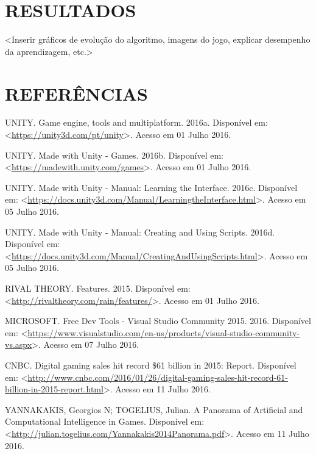 \documentclass[12pt,a4paper]{article}
\begin{document}

\FloatBarrier
\newpage %
\section{RESULTADOS}
	<Inserir gráficos de evolução do algoritmo, imagens do jogo, explicar desempenho da aprendizagem, etc.>

\FloatBarrier
\newpage %
\section*{\hfil REFERÊNCIAS}
	\singlespace
	UNITY. Game engine, tools and multiplatform. 2016a. Disponível em: \textless \url{https://unity3d.com/pt/unity}\textgreater. Acesso em 01 Julho 2016.\par
	UNITY. Made with Unity - Games. 2016b. Disponível em: \textless \url{https://madewith.unity.com/games}\textgreater. Acesso em 01 Julho 2016.\par
	UNITY. Made with Unity - Manual: Learning the Interface. 2016c. Disponível em: \textless \url{https://docs.unity3d.com/Manual/LearningtheInterface.html}\textgreater. Acesso em 05 Julho 2016.\par
	UNITY. Made with Unity - Manual: Creating and Using Scripts. 2016d. Disponível em: \textless \url{https://docs.unity3d.com/Manual/CreatingAndUsingScripts.html}\textgreater. Acesso em 05 Julho 2016.\par
	RIVAL THEORY. Features. 2015. Disponível em: \textless \url{http://rivaltheory.com/rain/features/}\textgreater. Acesso em 01 Julho 2016.\par
	MICROSOFT. Free Dev Tools - Visual Studio Community 2015. 2016. Disponível em: \textless \url{https://www.visualstudio.com/en-us/products/visual-studio-community-vs.aspx}\textgreater. Acesso em 07 Julho 2016.\par
	CNBC. Digital gaming sales hit record \$61 billion in 2015: Report. Disponível em: \textless \url{http://www.cnbc.com/2016/01/26/digital-gaming-sales-hit-record-61-billion-in-2015-report.html}\textgreater. Acesso em 11 Julho 2016.\par
	YANNAKAKIS, Georgios N; TOGELIUS, Julian. A Panorama of Artificial and Computational Intelligence in Games. Disponível em: \textless \url{http://julian.togelius.com/Yannakakis2014Panorama.pdf}\textgreater. Acesso em 11 Julho 2016.\par
\end{document}
